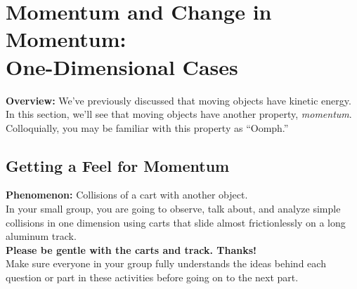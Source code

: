 \section[Momentum and Change in Momentum: 1-D Cases]{Momentum and Change in Momentum:\\One-Dimensional Cases}
\label{act7.1.1}


\begin{overview}

\textbf{Overview:} We've previously discussed that moving objects have kinetic energy. In this section, we'll see that moving objects have another property, \emph{momentum}. Colloquially, you may be familiar with this property as ``Oomph.''
\end{overview}


\subsection{Getting a Feel for Momentum}
\label{act7.1.1c}

\textbf{Phenomenon:} Collisions of a cart with another object.\\

\noindent In your small group, you are going to observe, talk about, and analyze simple collisions in one dimension using carts that slide almost frictionlessly on a long aluminum track.\\

\noindent\textbf{Please be gentle with the carts and track. Thanks!}\\

\noindent Make sure everyone in your group fully understands the ideas behind each question or part in these activities before going on to the next part.

